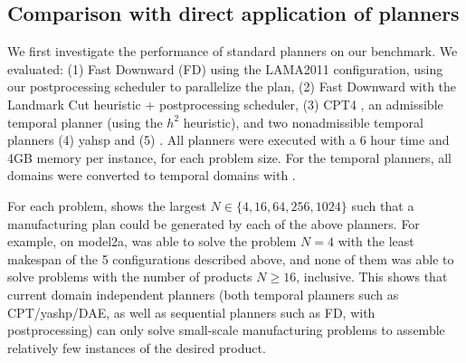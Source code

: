 \subsection{Comparison with direct application of \domind planners}
\label{sec:direct-domain-independent}
We first investigate the performance of standard \domind
planners on our benchmark.  We evaluated: 
(1) Fast Downward (FD) using the LAMA2011 configuration, using our postprocessing scheduler to parallelize the plan, 
(2) Fast Downward with the Landmark Cut heuristic + postprocessing scheduler, 
(3) CPT4 \cite{Vidal2011}, an admissible temporal planner (using the $h^2$ heuristic), and two nonadmissible temporal planners 
(4) yahsp \cite{Vidal2011a} and (5) \dae \cite{Dreo2011}.
All planners were executed 
with a 6 hour time and 4GB  memory per instance, for each problem size.
For the temporal planners, all domains were converted to temporal domains with .

For each problem,  shows the largest $N \in \{4,16,64,256,1024\}$ such that a
manufacturing plan could be generated by each of the above planners.
For example, on model2a, \dae was able to solve the problem $N=4$ with the least makespan
of the 5 configurations described above, and none of them was able to solve problems
with the number of products $N\geq 16$, inclusive.
This shows that current domain independent planners (both temporal
planners such as CPT/yashp/DAE, as well as sequential planners such as
FD, with postprocessing) can only solve small-scale manufacturing
problems to assemble relatively few instances of the desired product.



\setlength{\tabcolsep}{0.3mm}

\begin{table*}[htb]
{
%

}
\caption{Comparison of ACP, SCP, lower bounds (manually computed bound and CPT $h_2$ bound), and direct application of standard planners
for assembling 4, 16, 64, 256, 1024 products. 
Although we can't show all results due to space, ACP solves all instances up to 1024 products.
For \ca, all cases where at least 1 method other than ACP(i.e., SCP or standard planner) solved the problem are shown.
SCP always returns the same cyclic schedule regardless of $N$.
}
\label{results2}
\end{table*}


